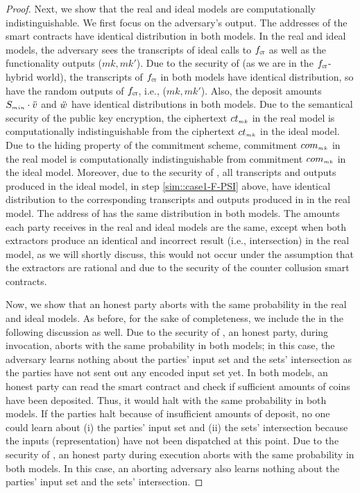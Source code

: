 \begin{proof}
Next, we show that the real and ideal models are computationally indistinguishable. We first focus on the adversary’s output. The addresses of the smart contracts have identical distribution in both models. In the real and ideal models, the adversary sees the transcripts of ideal calls to $f_{\scriptscriptstyle \mathtt{CT}}$ as well as the functionality outputs ($mk,  mk'$). Due to the security of \ct (as we are in the $f_{\scriptscriptstyle \mathtt{CT}}$-hybrid world), the transcripts of $f_{\scriptscriptstyle \mathtt{CT}}$ in both models have identical distribution, so have the random outputs of $f_{\scriptscriptstyle \mathtt{CT}}$, i.e., ($mk,  mk'$). Also, the deposit amounts $S_{\scriptscriptstyle min}\cdot \ddot{v}$ and $\ddot{w}$ have identical distributions in both models. Due to the semantical security of the public key encryption, the ciphertext $ct_{\scriptscriptstyle mk}$ in the real model is computationally indistinguishable from the ciphertext $ct_{\scriptscriptstyle {mk}}$ in the ideal model. Due to the hiding property of the commitment scheme, commitment $com_{\scriptscriptstyle mk}$ in the real model is computationally indistinguishable from commitment $com_{\scriptscriptstyle {mk}}$ in the ideal model.  
% 
Moreover, due to the security of \fpsi, all transcripts and outputs produced in the ideal model, in step \ref{sim::case1-F-PSI} above, have identical distribution to the corresponding transcripts and outputs produced in \fpsi in the real model.  
%
The address of \SCtc has the same distribution in both models. The amounts each party receives in the real and ideal models are the same, except when both extractors produce an identical and incorrect result (i.e., intersection) in the real model, as we will shortly discuss, this would not occur under the assumption that the extractors are rational and due to the security of the counter collusion smart contracts.

  

  

Now, we show that an honest party aborts with the same probability in the real and ideal models. As before, for the sake of completeness, we include the \fpsi in the following discussion as well.  Due to the security of \ct, an honest party, during \ct invocation, aborts with the same probability in both models; in this case, the adversary learns nothing about the parties' input set and the sets' intersection as the parties have not sent out any encoded input set yet. In both models, an honest party can read the smart contract and check if sufficient amounts of coins have been deposited. Thus, it would halt with the same probability in both models.  If the parties halt because of insufficient amounts of deposit, no one could learn about (i) the parties' input set and (ii) the sets' intersection because the inputs (representation) have not been dispatched at this point.  Due to the security of \zspaa, an honest party during \zspaa execution aborts with the same probability in both models.  In this case, an aborting adversary also learns nothing about the parties' input set and the sets' intersection. %





\end{proof}
